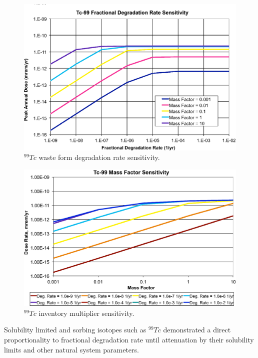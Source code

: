 \begin{figure}[H]
  \centering
  \includegraphics[width=\linewidth]{Tc99_deg_rate.eps}
  \caption{$^{99}Tc$ waste form degradation rate sensitivity.}
  \label{fig:WFDegTc99}
\end{figure}

\begin{figure}[H]
  \centering
  \includegraphics[width=\linewidth]{Tc99_mass_factor.eps}
  \caption{$^{99}Tc$ inventory multiplier sensitivity.}
  \label{fig:WFDegTc99MF}
\end{figure}

Solubility limited and sorbing isotopes such as $^{99}Tc$ demonstrated a direct 
proportionality to fractional degradation rate until attenuation by their 
solubility limits and other natural system parameters. 

